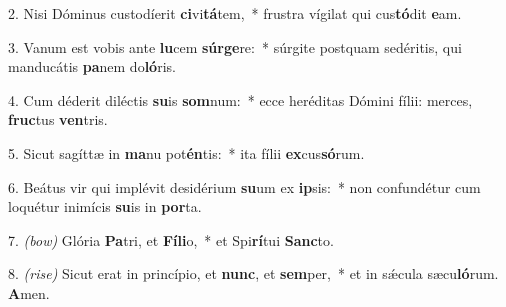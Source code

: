 2. Nisi Dóminus custodíerit \textbf{ci}vi\textbf{tá}tem,~* 
	frustra vígilat qui cus\textbf{tó}dit \textbf{e}am.

3. Vanum est vobis ante \textbf{lu}cem \textbf{súr}\textbf{ge}re:~* 	
	súrgite postquam sedéritis, qui manducátis \textbf{pa}nem do\textbf{ló}ris.

4. Cum déderit diléctis \textbf{su}is \textbf{som}num:~*	
	ecce heréditas Dómini fílii: merces, \textbf{fruc}tus \textbf{ven}tris.

5. Sicut sagíttæ in \textbf{ma}nu pot\textbf{én}tis:~* 
	ita fílii \textbf{ex}cus\textbf{só}rum.

6. Beátus vir qui implévit desidérium \textbf{su}um ex \textbf{ip}sis:~*
	non confundétur cum loquétur inimícis \textbf{su}is in \textbf{por}ta.

7. {\color{red}\textit{(bow)}} Glória \textbf{Pa}tri, et \textbf{Fí}\textbf{li}o,~*
	et Spi\textbf{rí}tui \textbf{Sanc}to.

8. {\color{red}\textit{(rise)}} Sicut erat in princípio, et \textbf{nunc}, et \textbf{sem}per,~* 
	et in s\'{\ae}cula sæcu\textbf{ló}rum. \textbf{A}men.